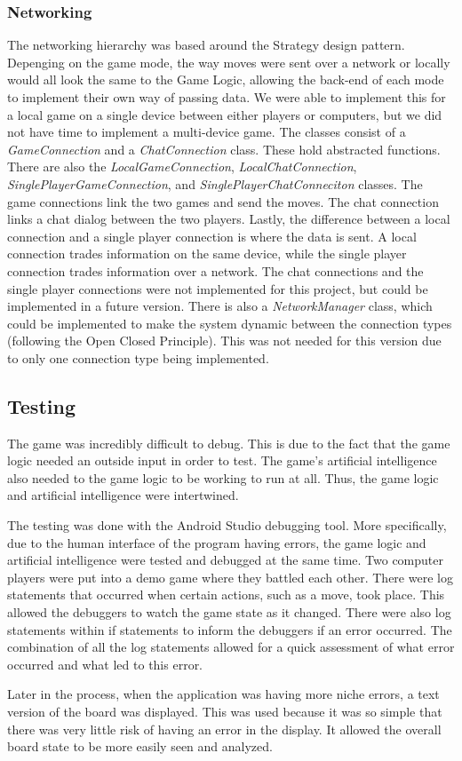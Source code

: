 \documentclass{article}
\begin{document}
\subsubsection{Networking}
	The networking hierarchy was based around the Strategy design pattern. Depenging on the game mode, the way moves were sent over a network or locally would all look the same to the Game Logic, allowing the back-end of each mode to implement their own way of passing data. We were able to implement this for a local game on a single device between either players or computers, but we did not have time to implement a multi-device game. The classes consist of a \textit{GameConnection} and a \textit{ChatConnection} class. These hold abstracted functions. There are also the \textit{LocalGameConnection}, \textit{LocalChatConnection}, \textit{SinglePlayerGameConnection}, and \textit{SinglePlayerChatConneciton} classes. The game connections link the two games and send the moves. The chat connection links a chat dialog between the two players. Lastly, the difference between a local connection and a single player connection is where the data is sent. A local connection trades information on the same device, while the single player connection trades information over a network. The chat connections and the single player connections were not implemented for this project, but could be implemented in a future version. There is also a \textit{NetworkManager} class, which could be implemented to make the system dynamic between the connection types (following the Open Closed Principle). This was not needed for this version due to only one connection type being implemented. 

\subsection{Testing}
	The game was incredibly difficult to debug. This is due to the fact that the game logic needed an outside input in order to test. The game's artificial intelligence also needed to the game logic to be working to run at all. Thus, the game logic and artificial intelligence were intertwined. \par
	The testing was done with the Android Studio debugging tool. More specifically, due to the human interface of the program having errors, the game logic and artificial intelligence were tested and debugged at the same time. Two computer players were put into a demo game where they battled each other. There were log statements that occurred when certain actions, such as a move, took place. This allowed the debuggers to watch the game state as it changed. There were also log statements within if statements to inform the debuggers if an error occurred. The combination of all the log statements allowed for a quick assessment of what error occurred and what led to this error. \par
	Later in the process, when the application was having more niche errors, a text version of the board was displayed. This was used because it was so simple that there was very little risk of having an error in the display. It allowed the overall board state to be more easily seen and analyzed.
\end{document}
